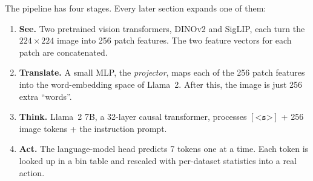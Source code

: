 \documentclass[11pt]{article}
\begin{document}
The pipeline has four stages. Every later section expands one of them:
\begin{enumerate}
  \item \textbf{See.} Two pretrained vision transformers, DINOv2 and SigLIP, each turn the $224\times224$ image into 256 patch features. The two feature vectors for each patch are concatenated.
  \item \textbf{Translate.} A small MLP, the \emph{projector}, maps each of the 256 patch features into the word-embedding space of Llama~2. After this, the image is just 256 extra ``words''.
  \item \textbf{Think.} Llama~2 7B, a 32-layer causal transformer, processes $[\texttt{<s>}]$ + 256 image tokens + the instruction prompt.
  \item \textbf{Act.} The language-model head predicts 7 tokens one at a time. Each token is looked up in a bin table and rescaled with per-dataset statistics into a real action.
\end{enumerate}
\end{document}
